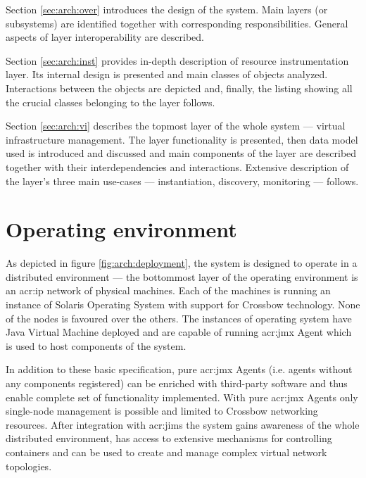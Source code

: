 \documentclass[11pt]{book}
\begin{document}
    Section \ref{sec:arch:over} introduces the design of the system. Main layers (or subsystems) are identified together
    with corresponding responsibilities. General aspects of layer interoperability are described.

    Section \ref{sec:arch:inst} provides in-depth description of resource instrumentation layer. Its internal design is
    presented and main classes of objects analyzed. Interactions between the objects are depicted and, finally, the
    listing showing all the crucial classes belonging to the layer follows.

    Section \ref{sec:arch:vi} describes the topmost layer of the whole system --- virtual infrastructure management. The
    layer functionality is presented, then data model used is introduced and discussed and main components of the layer
    are described together with their interdependencies and interactions. Extensive description of the layer's three
    main use-cases --- instantiation, discovery, monitoring --- follows.


    \section{Operating environment}
    \label{sec:arch:env}

      As depicted in figure \ref{fig:arch:deployment}, the system is designed to operate in a distributed environment
      --- the bottommost layer of the operating environment is an \gls{acr:ip} network of physical machines. Each of the machines
      is running an instance of Solaris Operating System with support for Crossbow technology. None of the nodes is
      favoured over the others. The instances of operating system have Java Virtual Machine deployed and are capable of
      running \gls{acr:jmx} Agent which is used to host components of the system.

      In addition to these basic specification, pure \gls{acr:jmx} Agents (i.e. agents without any components registered) can be
      enriched with third-party software and thus enable complete set of functionality implemented. With pure \gls{acr:jmx} Agents
      only single-node management is possible and limited to Crossbow networking resources. After integration with \gls{acr:jims}
      the system gains awareness of the whole distributed environment, has access to extensive mechanisms for
      controlling containers and can be used to create and manage complex virtual network topologies.
    
\end{document}
